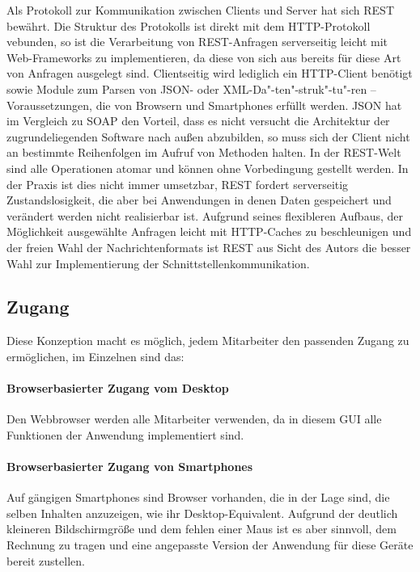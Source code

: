 Als Protokoll zur Kommunikation zwischen Clients und Server hat sich REST bewährt. Die Struktur des Protokolls ist direkt mit dem HTTP-Protokoll vebunden, so ist die Verarbeitung von REST-Anfragen serverseitig leicht mit Web-Frameworks zu implementieren, da diese von sich aus bereits für diese Art von Anfragen ausgelegt sind. Clientseitig wird lediglich ein HTTP-Client benötigt sowie Module zum Parsen von JSON- oder XML-Da"-ten"-struk"-tu"-ren -- Voraussetzungen, die von Browsern und Smartphones erfüllt werden. JSON hat im Vergleich zu SOAP den Vorteil, dass es nicht versucht die Architektur der zugrundeliegenden Software nach außen abzubilden, so muss sich der Client nicht an bestimmte Reihenfolgen im Aufruf von Methoden halten. In der REST-Welt sind alle Operationen atomar und können ohne Vorbedingung gestellt werden. In der Praxis ist dies nicht immer umsetzbar, REST fordert serverseitig Zustandslosigkeit, die aber bei Anwendungen in denen Daten gespeichert und verändert werden nicht realisierbar ist. Aufgrund seines flexibleren Aufbaus, der Möglichkeit ausgewählte Anfragen leicht mit HTTP-Caches zu beschleunigen und der freien Wahl der Nachrichtenformats ist REST aus Sicht des Autors die besser Wahl zur Implementierung der Schnittstellenkommunikation.

\subsection{Zugang}

Diese Konzeption macht es möglich, jedem Mitarbeiter den passenden Zugang zu ermöglichen, im Einzelnen sind das:

\paragraph{Browserbasierter Zugang vom Desktop} Den Webbrowser werden alle Mitarbeiter verwenden, da in diesem GUI alle Funktionen der Anwendung implementiert sind.

\paragraph{Browserbasierter Zugang von Smartphones} Auf gängigen Smartphones sind Browser vorhanden, die in der Lage sind, die selben Inhalten anzuzeigen, wie ihr Desktop-Equivalent. Aufgrund der deutlich kleineren Bildschirmgröße und dem fehlen einer Maus ist es aber sinnvoll, dem Rechnung zu tragen und eine angepasste Version der Anwendung für diese Geräte bereit zustellen. 

